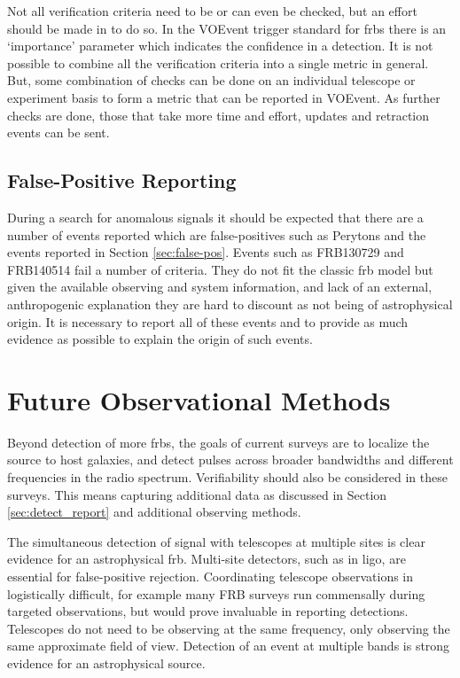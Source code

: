 \documentclass[a4paper,fleqn,usenatbib]{mnras}
\begin{document}
Not all verification criteria need to be or can even be checked, but an effort
should be made in to do so. In the VOEvent trigger standard for \glspl{frb}
\citep{2017arXiv171008155P} there is an `importance' parameter which indicates
the confidence in a detection. It is not possible to combine all the
verification criteria into a single metric in general. But, some combination of
checks can be done on an individual telescope or experiment basis to form a
metric that can be reported in VOEvent. As further checks are done, those that
take more time and effort, updates and retraction events can be sent.

\subsection{False-Positive Reporting}

During a search for anomalous signals it should be expected that there are a
number of events reported which are false-positives such as Perytons
\citep{2011ApJ...727...18B} and the events reported in Section
\ref{sec:false-pos}.  Events such as FRB130729 and FRB140514 fail a number of
criteria. They do not fit the classic \gls{frb} model but given the available
observing and system information, and lack of an external, anthropogenic
explanation they are hard to discount as not being of astrophysical origin. It
is necessary to report all of these events and to provide as much evidence as
possible to explain the origin of such events.

\section{Future Observational Methods}

Beyond detection of more \glspl{frb}, the goals of current surveys are to
localize the source to host galaxies, and detect pulses across broader
bandwidths and different frequencies in the radio spectrum. Verifiability should
also be considered in these surveys. This means capturing additional data as
discussed in Section \ref{sec:detect_report} and additional observing methods.

The simultaneous detection of signal with telescopes at multiple sites is
clear evidence for an astrophysical \gls{frb}.  Multi-site detectors, such as in
\gls{ligo}, are essential for false-positive rejection. Coordinating telescope
observations in logistically difficult, for example many FRB surveys run
commensally during targeted observations, but would prove invaluable in
reporting detections. Telescopes do not need to be observing at the same
frequency, only observing the same approximate field of view. Detection of an
event at multiple bands is strong evidence for an astrophysical source.
\end{document}
